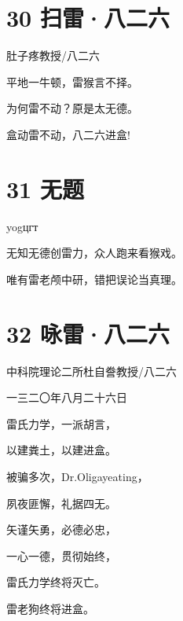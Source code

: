 \documentclass[UTF8,12pt,oneside]{ctexbook}
\begin{document}
        \section{30 扫雷·八二六}
        \begin{center}
            肚子疼教授/八二六
        \end{center}
            
        \begin{center}
            平地一牛顿，雷猴言不择。
            
            为何雷不动？原是太无德。
        
            盒动雷不动，八二六进盒!
        \end{center}
        
        \section{31 无题}
        \begin{center}
            yogцгт
        \end{center}
            
        \begin{center}
            无知无德创雷力，众人跑来看猴戏。
            
            唯有雷老颅中研，错把误论当真理。
        \end{center}
        
        \section{32 咏雷·八二六}
        \begin{center}
            中科院理论二所杜自誊教授/八二六
            
            一三二〇年八月二十六日
        \end{center}
            
        \begin{center}
            雷氏力学，一派胡言，
            
            以建粪土，以建进盒。
            
            被骗多次，Dr.Oligayeating，
            
            夙夜匪懈，礼据四无。
            
            矢谨矢勇，必德必忠，
            
            一心一德，贯彻始终，
            
            雷氏力学终将灭亡。
            
            雷老狗终将进盒。
        \end{center}
        
\end{document}
